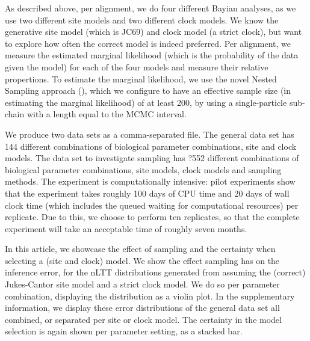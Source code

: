
As described above, per alignment, we do four different Bayian analyses,
as we use two different site models and two different clock models.
We know the generative site model (which is JC69) and clock 
model (a strict clock), but want to explore how often the correct model
is indeed preferred. Per alignment, we measure the estimated marginal 
likelihood (which is the probability of the data given the model)
for each of the four models and measure their relative propertions.
To estimate the marginal likelihood, we use the novel 
Nested Sampling approach (\cite{maturana_et_al_2018}),
which we configure to have an effective sample size (in estimating
the marginal likelihood) of at least 200, by using a single-particle
sub-chain with a length equal to the MCMC interval.

We produce two data sets as a comma-separated file.
The general data set has 144  different combinations
of biological parameter combinations, site and clock models.
The data set to investigate sampling has ?552  different combinations
of biological parameter combinations, site models, clock models 
and sampling methods. The experiment is computationally intensive:
pilot experiments show that the experiment takes roughly 100 days
of CPU time and 20 days of wall clock time (which includes the queued 
waiting for computational resources) per replicate. 
Due to this, we choose to perform ten replicates, so that the complete
experiment will take an acceptable time of roughly seven months. 

In this article, we showcase the effect of sampling
and the certainty when selecting a (site and clock) model. 
We show the effect sampling has on the inference error,
for the nLTT distributions generated from assuming the (correct) Jukes-Cantor 
site model and a strict clock model. We do so per parameter combination,
displaying the distribution as a violin plot.
In the supplementary information, we display these error distributions 
of the general data set all combined, or separated per site or clock model.
The certainty in the model selection is again shown per parameter setting,
as a stacked bar. 

